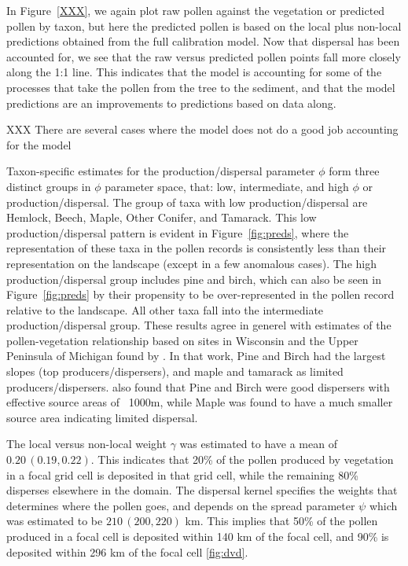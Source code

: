 \documentclass[12pt]{article}
\begin{document}
In Figure~\ref{XXX}, we again plot raw pollen against the vegetation
or predicted pollen by taxon, but here the predicted pollen is based
on the local plus non-local predictions obtained from the full
calibration model. Now that dispersal has been accounted for, we see
that the raw versus predicted pollen points fall more closely along
the 1:1 line. This indicates that the model is accounting for some of
the processes that take the pollen from the tree to the sediment, and
that the model predictions are an improvements to predictions based on
data along.

XXX There are several cases where the model does not do a good job accounting for the model   

Taxon-specific estimates for the production/dispersal parameter $\phi$
form three distinct groups in $\phi$ parameter space, that: low,
intermediate, and high $\phi$ or production/dispersal. The group of
taxa with low production/dispersal are Hemlock, Beech, Maple, Other
Conifer, and Tamarack. This low production/dispersal pattern is
evident in Figure~\ref{fig:preds}, where the representation of these
taxa in the pollen records is consistently less than their
representation on the landscape (except in a few anomalous cases). The
high production/dispersal group includes pine and birch, which can
also be seen in Figure~\ref{fig:preds} by their propensity to be
over-represented in the pollen record relative to the landscape. All
other taxa fall into the intermediate production/dispersal
group. These results agree in generel with estimates of the
pollen-vegetation relationship based on sites in Wisconsin and the
Upper Peninsula of Michigan found by \cite{prentice1986}. In that
work, Pine and Birch had the largest slopes (top
producers/dispersers), and maple and tamarack as limited
producers/dispersers. \cite{jackson1990} also found that Pine and
Birch were good dispersers with effective source areas of ~1000m,
while Maple was found to have a much smaller source area indicating
limited dispersal.

The local versus non-local weight $\gamma$ was estimated to have a
mean of $0.20\,(0.19, 0.22)$. This indicates that 20\% of the pollen
produced by vegetation in a focal grid cell is deposited in that grid
cell, while the remaining 80\% disperses elsewhere in the domain. The
dispersal kernel specifies the weights that determines where the
pollen goes, and depends on the spread parameter $\psi$ which was
estimated to be $210\,(200, 220)$ km. This implies that 50\% of the
pollen produced in a focal cell is deposited within 140 km of the
focal cell, and 90\% is deposited within 296 km of the focal cell \ref{fig:dvd}.
\end{document}
